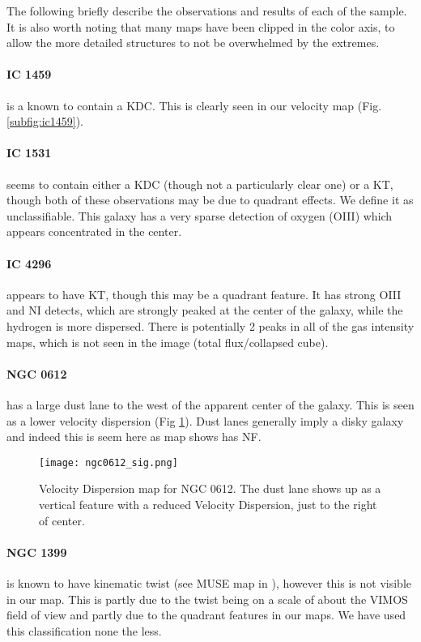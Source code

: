 \documentclass[fleqn,usenatbib,useAMS]{mnras}
\begin{document}
	The following briefly describe the observations and results of each of the sample. It is also worth noting that many maps have been clipped in the color axis, to allow the more detailed structures to not be overwhelmed by the extremes. 

	\paragraph{IC 1459} is a known to contain a KDC. This is clearly seen in our velocity map (Fig. \ref{subfig:ic1459}).

	\paragraph{IC 1531} seems to contain either a KDC (though not a particularly clear one) or a KT, though both of these observations may be due to quadrant effects. We define it as unclassifiable. This galaxy has a very sparse detection of oxygen (OIII) which appears concentrated in the center.

	\paragraph{IC 4296} appears to have KT, though this may be a quadrant feature. It has strong OIII and NI detects, which are strongly peaked at the center of the galaxy, while the hydrogen is more dispersed. There is potentially 2 peaks in all of the gas intensity maps, which is not seen in the image (total flux/collapsed cube).

	\paragraph{NGC 0612} has a large dust lane to the west of the apparent center of the galaxy. This is seen as a lower velocity dispersion (Fig \ref{fig:ngc0612_sig}). Dust lanes generally imply a disky galaxy and indeed this is seem here as map shows has NF. 

	\begin{figure}[!ht]
		\centering
		\texttt{[image: ngc0612\_sig.png]}
		\caption{Velocity Dispersion map for NGC 0612. The dust lane shows up as a vertical feature with a reduced Velocity Dispersion, just to the right of center.}
		\label{fig:ngc0612_sig}
	\end{figure}

	\paragraph{NGC 1399} is known to have kinematic twist (see MUSE map in \citet{Zieleniewski2017}), however this is not visible in our map. This is partly due to the twist being on a scale of about the VIMOS field of view and partly due to the quadrant features in our maps. We have used this classification none the less. 
\end{document}
